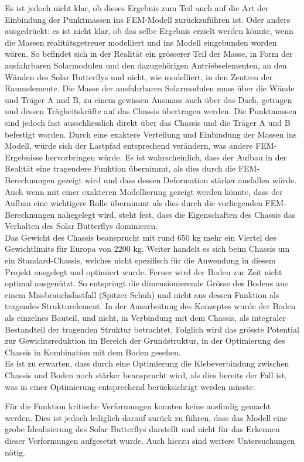 Es ist jedoch nicht klar, ob dieses Ergebnis zum Teil auch auf die Art der Einbindung der Punktmassen ins FEM-Modell zurückzuführen ist. Oder anders ausgedrückt: es ist nicht klar, ob das selbe Ergebnis erzielt werden könnte, wenn die Massen realitätsgetreuer modelliert und ins Modell eingebunden worden wären. So befindet sich in der Realität ein grösserer Teil der Masse, in Form der ausfahrbaren Solarmodulen und den dazugehörigen Antriebselementen, an den Wänden des Solar Butterflys und nicht, wie modelliert, in den Zentren der Raumelemente.
Die Masse der ausfahrbaren Solarmodulen muss über die Wände und Träger A und B, zu einem gewissen Ausmass auch über das Dach, getragen und dessen Trägheitskräfte auf das Chassis übertragen werden. Die Punktmassen sind jedoch fast ausschliesslich direkt über das Chassis und die Träger A und B befestigt worden. Durch eine exaktere Verteilung und Einbindung der Massen ins Modell, würde sich der Lastpfad entsprechend verändern, was andere FEM-Ergebnisse hervorbringen würde.
Es ist wahrscheinlich, dass der Aufbau in der Realität eine tragendere Funktion übernimmt, als dies durch die FEM-Berechnungen gezeigt wird und dass dessen Deformation stärker ausfallen würde.\\
Auch wenn mit einer exakteren Modellierung gezeigt werden könnte, dass der Aufbau eine wichtigere Rolle übernimmt als dies durch die vorliegenden FEM-Berechnungen nahegelegt wird, steht fest, dass die Eigenschaften des Chassis das Verhalten des Solar Butterflys dominieren.\\

Das Gewicht des Chassis beansprucht mit rund 650 kg mehr ein Viertel des Gewichtlimits für Europa von 2200 kg. Weiter handelt es sich beim Chassis um ein \glqq Standard-Chassis\grqq{}, welches nicht spezifisch für die Anwendung in diesem Projekt ausgelegt und optimiert wurde. Ferner wird der Boden zur Zeit nicht optimal ausgenützt. So entspringt die dimensionierende Grösse des Bodens aus einem Missbrauchslastfall (\glqq Spitzer Schuh\grqq{}) und nicht aus dessen Funktion als tragendes Strukturelement. In der Ausarbeitung des Konzeptes wurde der Boden als einzelnes Bauteil, und nicht, in Verbindung mit dem Chassis, als integraler Bestandteil der tragenden Struktur betrachtet. Folglich wird das grösste Potential zur Gewichtsreduktion im Bereich der Grundstruktur, in der Optimierung des Chassis in Kombination mit dem Boden gesehen.\\
Es ist zu erwarten, dass durch eine Optimierung die Klebeverbindung zwischen Chassis und Boden noch stärker beansprucht wird, als dies bereits der Fall ist, was in einer Optimierung entsprechend berücksichtigt werden müsste.

Für die Funktion kritische Verformungen konnten keine ausfindig gemacht werden. Dies ist jedoch lediglich darauf zurück zu führen, dass das Modell eine grobe Idealisierung des Solar Butterflys darstellt und nicht für das Erkennen dieser Verformungen aufgesetzt wurde. Auch hierzu sind weitere Untersuchungen nötig.


\newpage
